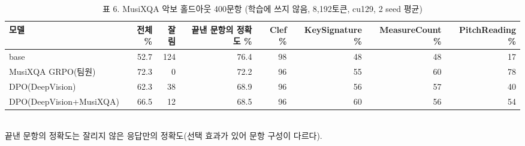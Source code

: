 \begin{table}[t]
\centering
\small
\caption{표 6. MusiXQA 악보 홀드아웃 400문항 (학습에 쓰지 않음, 8,192토큰, cu129, 2 seed 평균)}
\label{tab:table6_holdout}
\begin{tabular}{lrrrrrrr}
\toprule
모델 & 전체 \% & 잘림 & 끝낸 문항의 정확도 \% & Clef \% & KeySignature \% & MeasureCount \% & PitchReading \% \\
\midrule
base & 52.7 & 124 & 76.4 & 98 & 48 & 48 & 17 \\
MusiXQA GRPO(팀원) & 72.3 & 0 & 72.2 & 96 & 55 & 60 & 78 \\
DPO(DeepVision) & 62.3 & 38 & 68.9 & 96 & 56 & 57 & 40 \\
DPO(DeepVision+MusiXQA) & 66.5 & 12 & 68.5 & 96 & 60 & 56 & 54 \\
\bottomrule
\end{tabular}
\\[2pt]{\footnotesize 끝낸 문항의 정확도는 잘리지 않은 응답만의 정확도(선택 효과가 있어 문항 구성이 다르다).}
\end{table}
